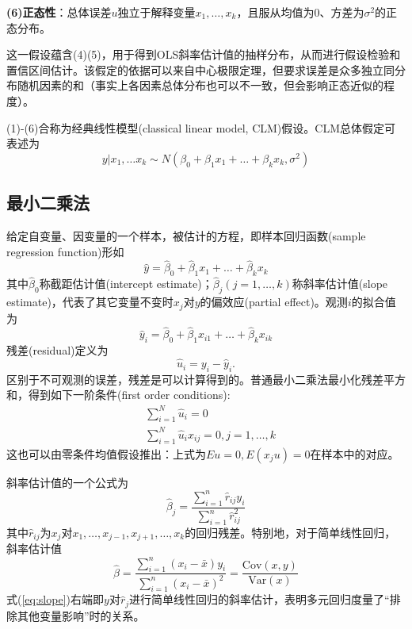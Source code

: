 \par \textbf{(6)正态性}：总体误差$u$独立于解释变量$x_1,\dots,x_k$，且服从均值为0、方差为$\sigma^2$的正态分布。
\par 这一假设蕴含(4)(5)，用于得到OLS斜率估计值的抽样分布，从而进行假设检验和置信区间估计。该假定的依据可以来自中心极限定理，但要求误差是众多独立同分布随机因素的和（事实上各因素总体分布也可以不一致，但会影响正态近似的程度）。

\par (1)-(6)合称为经典线性模型(classical linear model, CLM)假设。CLM总体假定可表述为
\begin{equation}
    y\vert x_1,\dots x_k \sim N(\beta_0+\beta_1x_1+\dots+\beta_kx_k,\sigma^2)
\end{equation}

\subsection{最小二乘法}

\par 给定自变量、因变量的一个样本，被估计的方程，即样本回归函数(sample regression function)形如
\begin{equation}
    \hat{y}=\hat{\beta}_0+\hat{\beta}_1 x_1+\dots+\hat{\beta}_k x_k
\end{equation}
其中$\hat{\beta}_0$称截距估计值(intercept estimate)；$\hat{\beta}_j(j=1,\dots,k)$称斜率估计值(slope estimate)，代表了其它变量不变时$x_j$对$y$的偏效应(partial effect)。观测$i$的拟合值为
\begin{equation}
    \hat{y}_i=\hat{\beta}_0+\hat{\beta}_1 x_{i1}+\dots+\hat{\beta}_k x_{ik}
\end{equation}
残差(residual)定义为
\begin{equation}
    \hat{u}_i = y_i-\hat{y}_i.
\end{equation}
区别于不可观测的误差，残差是可以计算得到的。普通最小二乘法最小化残差平方和，得到如下一阶条件(first order conditions):
\begin{align}
    &\sum_{i=1}^N \hat{u}_i=0\\
    &\sum_{i=1}^N \hat{u}_ix_{ij}=0, j=1,\dots,k
\end{align}
这也可以由零条件均值假设推出：上式为$Eu=0, E(x_ju)=0$在样本中的对应。

\par 斜率估计值的一个公式为
\begin{equation}
\hat{\beta}_j=\frac{\sum_{i=1}^n \hat{r}_{ij}y_i}{\sum_{i=1}^n \hat{r}_{ij}^2}
\label{eq:slope}
\end{equation}
其中$\hat{r}_{ij}$为$x_j$对$x_1,\dots,x_{j-1},x_{j+1},\dots,x_k$的回归残差。特别地，对于简单线性回归，斜率估计值
\begin{equation}
\hat{\beta}=\frac{\sum_{i=1}^n (x_i-\bar{x})y_i}{\sum_{i=1}^n (x_i-\bar{x})^2}=\frac{\mathrm{Cov}(x,y)}{\mathrm{Var}(x)}
\end{equation}
式(\ref{eq:slope})右端即$y$对$\hat{r}_{j}$进行简单线性回归的斜率估计，表明多元回归度量了“排除其他变量影响”时的关系。

